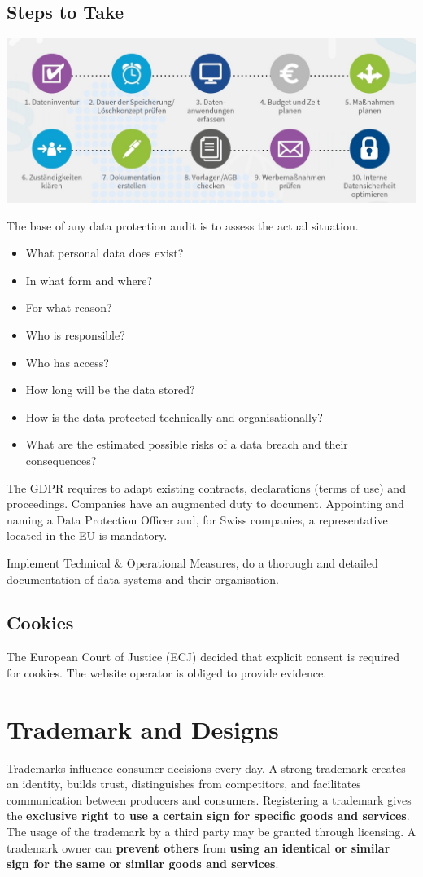 \documentclass[11pt]{article}
\theoremstyle{definition}
\begin{document}
\subsection{Steps to Take}
\begin{center}
	\includegraphics[width=\linewidth]{img/gdpr_step_by_step_plan}
\end{center}
The base of any data protection audit is to assess the actual situation.
\begin{itemize}[noitemsep]
	\item What personal data does exist?
	\item In what form and where?
	\item For what reason?
	\item Who is responsible?
	\item Who has access?
	\item How long will be the data stored?
	\item How is the data protected technically and organisationally?
	\item What are the estimated possible risks of a data breach and their consequences?
\end{itemize}
The GDPR requires to adapt existing contracts, declarations (terms of use) and proceedings. Companies have an augmented duty to document. Appointing and naming a Data Protection Officer and, for Swiss companies, a representative located in the EU is mandatory.

Implement Technical \& Operational Measures, do a thorough and detailed documentation of data systems and their organisation.

\subsection{Cookies}
The European Court of Justice (ECJ) decided that explicit consent is required for cookies. The website operator is obliged to provide evidence.

\section{Trademark and Designs}
Trademarks influence consumer decisions every day. A strong trademark creates an identity, builds trust, distinguishes from competitors, and facilitates communication between producers and consumers. Registering a trademark gives the \textbf{exclusive right to use a certain sign for specific goods and services}. The usage of the trademark by a third party may be granted through licensing. A trademark owner can \textbf{prevent others} from \textbf{using an identical or similar sign for the same or similar goods and services}.
\end{document}
